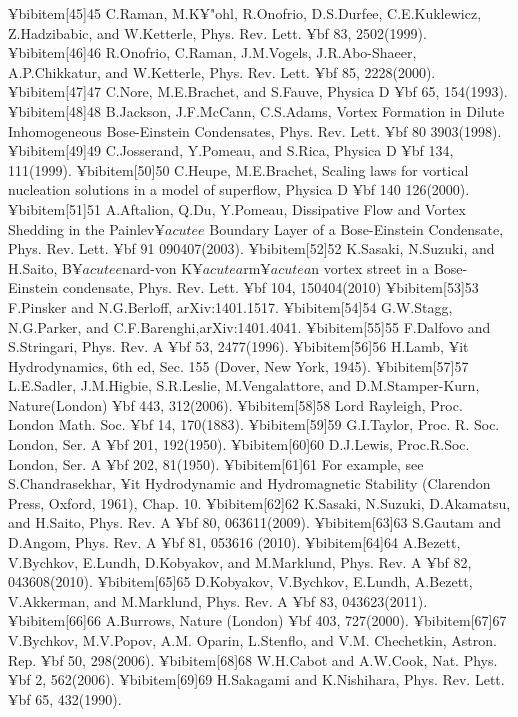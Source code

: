 {{{{{¥bibitem[45]{45} C.Raman, M.K¥"{o}hl, R.Onofrio, D.S.Durfee, C.E.Kuklewicz, Z.Hadzibabic, and W.Ketterle, Phys. Rev. Lett. {¥bf 83}, 2502(1999).
¥bibitem[46]{46} R.Onofrio, C.Raman, J.M.Vogels, J.R.Abo-Shaeer, A.P.Chikkatur, and W.Ketterle, Phys. Rev. Lett. {¥bf 85}, 2228(2000).
¥bibitem[47]{47} C.Nore, M.E.Brachet, and S.Fauve, Physica D {¥bf 65}, 154(1993).
¥bibitem[48]{48} B.Jackson, J.F.McCann, C.S.Adams, Vortex Formation in Dilute Inhomogeneous Bose-Einstein Condensates, Phys. Rev. Lett. {¥bf 80} 3903(1998).
¥bibitem[49]{49} C.Josserand, Y.Pomeau, and S.Rica, Physica D {¥bf 134}, 111(1999).
¥bibitem[50]{50} C.Heupe, M.E.Brachet, Scaling laws for vortical nucleation solutions in a model of superflow, Physica D {¥bf 140} 126(2000).
¥bibitem[51]{51} A.Aftalion, Q.Du, Y.Pomeau, Dissipative Flow and Vortex Shedding in the Painlev$¥acute{e}$ Boundary Layer of a Bose-Einstein Condensate, Phys. Rev. Lett. {¥bf 91} 090407(2003).
¥bibitem[52]{52} K.Sasaki, N.Suzuki, and H.Saito, B$¥acute{e}$nard-von K$¥acute{a}$rm$¥acute{a}$n vortex street in a Bose-Einstein condensate, Phys. Rev. Lett. {¥bf 104}, 150404(2010)
¥bibitem[53]{53} F.Pinsker and N.G.Berloff, arXiv:1401.1517.
¥bibitem[54]{54} G.W.Stagg, N.G.Parker, and C.F.Barenghi,arXiv:1401.4041.
¥bibitem[55]{55} F.Dalfovo and S.Stringari, Phys. Rev. A {¥bf 53}, 2477(1996).
¥bibitem[56]{56} H.Lamb, {¥it Hydrodynamics}, 6th ed, Sec. 155 (Dover, New York, 1945).
¥bibitem[57]{57} L.E.Sadler, J.M.Higbie, S.R.Leslie, M.Vengalattore, and D.M.Stamper-Kurn, Nature(London) {¥bf 443}, 312(2006).
¥bibitem[58]{58} Lord Rayleigh, Proc. London Math. Soc. {¥bf 14}, 170(1883).
¥bibitem[59]{59} G.I.Taylor, Proc. R. Soc. London, Ser. A {¥bf 201}, 192(1950).
¥bibitem[60]{60} D.J.Lewis, Proc.R.Soc. London, Ser. A {¥bf 202}, 81(1950).
¥bibitem[61]{61} For example, see S.Chandrasekhar, {¥it Hydrodynamic and Hydromagnetic Stability} (Clarendon Press, Oxford, 1961), Chap. 10.
¥bibitem[62]{62} K.Sasaki, N.Suzuki, D.Akamatsu, and H.Saito, Phys. Rev. A {¥bf 80}, 063611(2009).
¥bibitem[63]{63} S.Gautam and D.Angom, Phys. Rev. A {¥bf 81}, 053616 (2010).
¥bibitem[64]{64} A.Bezett, V.Bychkov, E.Lundh, D.Kobyakov, and M.Marklund, Phys. Rev. A {¥bf 82}, 043608(2010).
¥bibitem[65]{65} D.Kobyakov, V.Bychkov, E.Lundh, A.Bezett, V.Akkerman, and M.Marklund, Phys. Rev. A {¥bf 83}, 043623(2011).
¥bibitem[66]{66} A.Burrows, Nature (London) {¥bf 403}, 727(2000).
¥bibitem[67]{67} V.Bychkov, M.V.Popov, A.M. Oparin, L.Stenflo, and V.M. Chechetkin, Astron. Rep. {¥bf 50}, 298(2006).
¥bibitem[68]{68} W.H.Cabot and A.W.Cook, Nat. Phys. {¥bf 2}, 562(2006).
¥bibitem[69]{69} H.Sakagami and K.Nishihara, Phys. Rev. Lett. {¥bf 65}, 432(1990).
}}}}}
